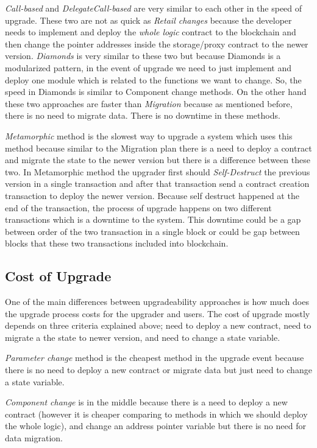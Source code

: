 \textit{Call-based} and \textit{DelegateCall-based} are very similar to each other in the speed of upgrade. These two are not as quick as \textit{Retail changes} because the developer needs to implement and deploy the \textit{whole logic} contract to the blockchain and then change the pointer addresses inside the storage/proxy contract to the newer version. \textit{Diamonds} is very similar to these two but because Diamonds is a modularized pattern, in the event of upgrade we need to just implement and deploy one module which is related to the functions we want to change. So, the speed in Diamonds is similar to Component change methods.
On the other hand these two approaches are faster than \textit{Migration} because as mentioned before, there is no need to migrate data. There is no downtime in these methods.

\textit{Metamorphic} method is the slowest way to upgrade a system which uses this method because similar to the Migration plan there is a need to deploy a contract and migrate the state to the newer version but there is a difference between these two. In Metamorphic method the upgrader first should \textit{Self-Destruct} the previous version in a single transaction and after that transaction send a contract creation transaction to deploy the newer version. Because self destruct happened at the end of the transaction, the process of upgrade happens on two different transactions which is a downtime to the system. This downtime could be a gap between order of the two transaction in a single block or could be gap between blocks that these two transactions included into blockchain. 



\subsection{Cost of Upgrade}

 One of the main differences between upgradeability approaches is how much does the upgrade process costs for the upgrader and users. The cost of upgrade mostly depends on three criteria explained above; need to deploy a new contract, need to migrate a the state to newer version, and need to change a state variable.

 \textit{Parameter change} method is the cheapest method in the upgrade event because there is no need to deploy a new contract or migrate data but just need to change a state variable.

 \textit{Component change} is in the middle because there is a need to deploy a new contract (however it is cheaper comparing to methods in which we should deploy the whole logic), and change an address pointer variable but there is no need for data migration.

